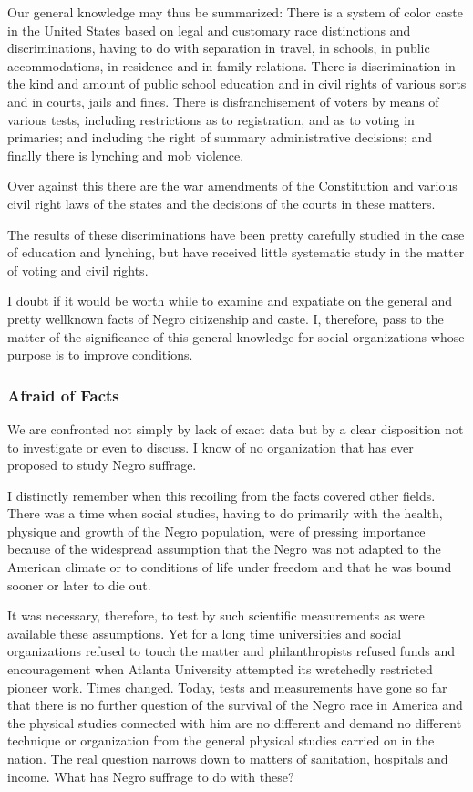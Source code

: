 \documentclass[letterpaper,10pt,english]{jupyterBook}
\begin{document}
\sphinxAtStartPar
Our general knowledge may thus be summarized: There is a system of color caste in the United States based on legal and customary race distinctions and discriminations, having to do with separation in travel, in schools, in public accommodations, in residence and in family relations. There is discrimination in the kind and amount of public school education and in civil rights of various sorts and in courts, jails and fines. There is disfranchisement of voters by means of various tests, including restrictions as to registration, and as to voting in primaries; and including the right of summary administrative decisions; and finally there is lynching and mob violence.

\sphinxAtStartPar
Over against this there are the war amendments of the Constitution and various civil right laws of the states and the decisions of the courts in these matters.

\sphinxAtStartPar
The results of these discriminations have been pretty carefully studied in the case of education and lynching, but have received little systematic study in the matter of voting and civil rights.

\sphinxAtStartPar
I doubt if it would be worth while to examine and expatiate on the general and pretty well\sphinxhyphen{}known facts of Negro citizenship and caste. I, therefore, pass to the matter of the significance of this general knowledge for social organizations whose purpose is to improve conditions.


\subsubsection{Afraid of Facts}
\label{\detokenize{Volumes/36/05/negro_citizen:afraid-of-facts}}
\sphinxAtStartPar
We are confronted not simply by lack of exact data but by a clear disposition not to investigate or even to discuss. I know of no organization that has ever proposed to study Negro suffrage.

\sphinxAtStartPar
I distinctly remember when this recoiling from the facts covered other fields. There was a time when social studies, having to do primarily with the health, physique and growth of the Negro population, were of pressing importance because of the widespread assumption that the Negro was not adapted to the American climate or to conditions of life under freedom and that he was bound sooner or later to die out.

\sphinxAtStartPar
It was necessary, therefore, to test by such scientific measurements as were available these assumptions. Yet for a long time universities and social organizations refused to touch the matter and philanthropists refused funds and encouragement when Atlanta University attempted its wretchedly restricted pioneer work. Times changed. Today, tests and measurements have gone so far that there is no further question of the survival of the Negro race in America and the physical studies connected with him are no different and demand no different technique or organization from the general physical studies carried on in the nation. The real question narrows down to matters of sanitation, hospitals and income. What has Negro suffrage to do with these?
\end{document}
